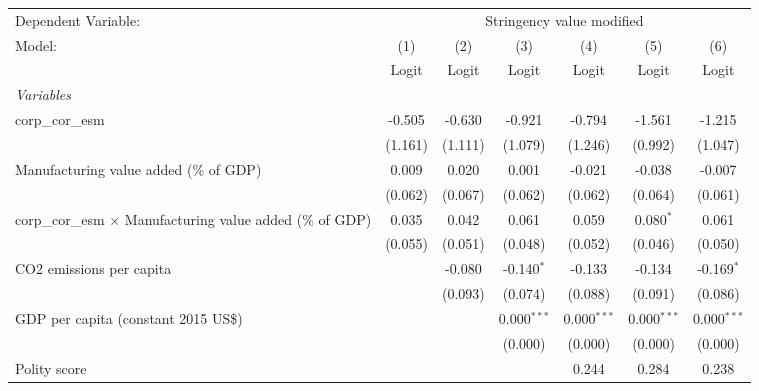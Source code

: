 
\begingroup
\centering
\begin{tabular}{lcccccc}
   \toprule
   Dependent Variable: & \multicolumn{6}{c}{Stringency value modified}\\
   Model:                                                            & (1)     & (2)     & (3)           & (4)           & (5)           & (6)\\  
                                                                     &  Logit  & Logit   & Logit         & Logit         & Logit         & Logit\\  
   \midrule
   \emph{Variables}\\
   corp\_cor\_esm                                                    & -0.505  & -0.630  & -0.921        & -0.794        & -1.561        & -1.215\\   
                                                                     & (1.161) & (1.111) & (1.079)       & (1.246)       & (0.992)       & (1.047)\\   
   Manufacturing value added (\% of GDP)                             & 0.009   & 0.020   & 0.001         & -0.021        & -0.038        & -0.007\\   
                                                                     & (0.062) & (0.067) & (0.062)       & (0.062)       & (0.064)       & (0.061)\\   
   corp\_cor\_esm $\times$ Manufacturing value added (\% of GDP)     & 0.035   & 0.042   & 0.061         & 0.059         & 0.080$^{*}$   & 0.061\\   
                                                                     & (0.055) & (0.051) & (0.048)       & (0.052)       & (0.046)       & (0.050)\\   
   CO2 emissions per capita                                          &         & -0.080  & -0.140$^{*}$  & -0.133        & -0.134        & -0.169$^{*}$\\   
                                                                     &         & (0.093) & (0.074)       & (0.088)       & (0.091)       & (0.086)\\   
   GDP per capita (constant 2015 US\$)                               &         &         & 0.000$^{***}$ & 0.000$^{***}$ & 0.000$^{***}$ & 0.000$^{***}$\\   
                                                                     &         &         & (0.000)       & (0.000)       & (0.000)       & (0.000)\\   
   Polity score                                                      &         &         &               & 0.244         & 0.284         & 0.238\\   

\end{tabular}
